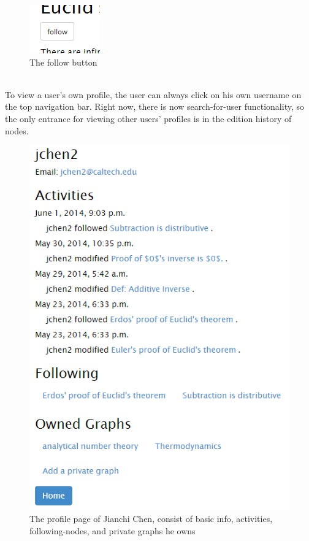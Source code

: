 \documentclass{acm_proc_article-sp}
\begin{document}
\begin{itemize}
\begin{figure}[h!]
\includegraphics[scale=0.8]{follow.png}
\caption{The follow button}
\end{figure}\\
To view a user's own profile, the user can always click on his own username on the top navigation bar. Right now, there is now search-for-user functionality, so the only entrance for viewing other users' profiles is in the edition history of nodes. 
\begin{figure}[h!]
\centering
\includegraphics[scale=0.52]{profile.png}
\caption{The profile page of Jianchi Chen, consist of basic info, activities, following-nodes, and private graphs he owns}
\end{figure}\\


\end{itemize}
\end{document}
